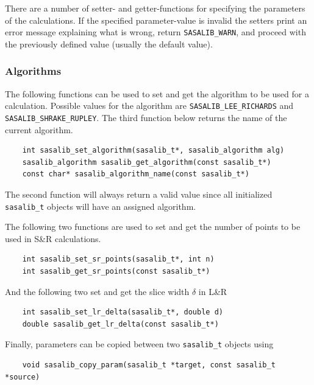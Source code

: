 \documentclass[a4paper,11pt]{article}
\begin{document}
There are a number of setter- and getter-functions for specifying the
parameters of the calculations. If the specified parameter-value is
invalid the setters print an error message explaining what is wrong,
return \verb|SASALIB_WARN|, and proceed with the previously defined
value (usually the default value).

\subsubsection{Algorithms}

The following functions can be used to set and get the algorithm to be
used for a calculation. Possible values for the algorithm are
\verb|SASALIB_LEE_RICHARDS| and \verb|SASALIB_SHRAKE_RUPLEY|.  The
third function below returns the name of
the current algorithm.
\begin{verbatim}
    int sasalib_set_algorithm(sasalib_t*, sasalib_algorithm alg)
    sasalib_algorithm sasalib_get_algorithm(const sasalib_t*)
    const char* sasalib_algorithm_name(const sasalib_t*)
\end{verbatim}
The second function will always return a valid value since all
initialized \verb|sasalib_t| objects will have an assigned algorithm.

The following two functions are used to set and get the number of
points to be used in S\&R calculations. 
\begin{verbatim}
    int sasalib_set_sr_points(sasalib_t*, int n)
    int sasalib_get_sr_points(const sasalib_t*)
\end{verbatim}
And the following two set and get the slice width $\delta$ in L\&R
\begin{verbatim}
    int sasalib_set_lr_delta(sasalib_t*, double d) 
    double sasalib_get_lr_delta(const sasalib_t*)
\end{verbatim}
Finally, parameters can be copied between two \verb|sasalib_t| objects
using
\begin{verbatim}
    void sasalib_copy_param(sasalib_t *target, const sasalib_t *source)
\end{verbatim}
\end{document}
